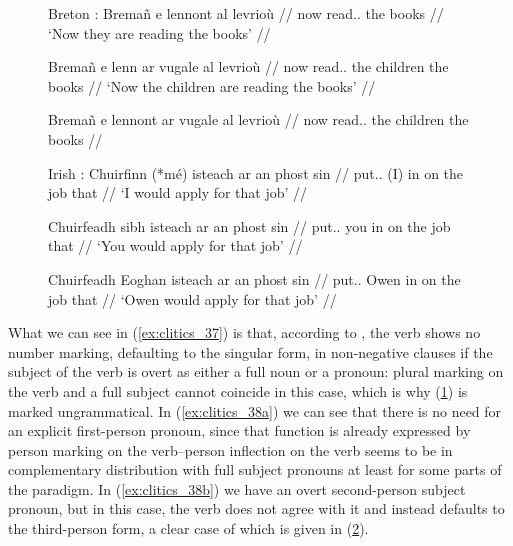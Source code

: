 \begin{figure}
\pex\label{ex:clitics_37}
Breton \parencites[145]{spencerluis2012}[from][]{borsleyetal2007}:
\a\label{ex:clitics_37a}
\begingl
	\gla Bremañ e lennont al levrioù //
	\glb now \Prt{} read.\Prs{}.\Tpl{} the books //
	\glft `Now they are reading the books' //
\endgl

\a\label{ex:clitics_37b}\begingl
	\gla Bremañ e lenn ar vugale al levrioù //
	\glb now \Prt{} read.\Prs{}.\Tsg{} the children the books //
	\glft `Now the children are reading the books' //
\endgl

\a\label{ex:clitics_37c}\ljudge{*}\begingl
	\gla Bremañ e lennont ar vugale al levrioù //
	\glb now \Prt{} read.\Prs{}.\Tpl{} the children the books //
\endgl
\xe
\end{figure}

\begin{figure}
\pex\label{ex:clitics_38}
Irish \parencites[145]{spencerluis2012}[from][]{mccloskeyhale1984}:
\a\label{ex:clitics_38a}
\begingl
	\gla Chuirfinn \textup{(}*mé\textup{)} isteach ar an phost sin //
	\glb put.\Cond{}.\Fsg{} (​I​) in on the job that //
	\glft `I would apply for that job' //
\endgl

\a\label{ex:clitics_38b}\begingl
	\gla Chuirfeadh sibh isteach ar an phost sin //
	\glb put.\Cond{}.\Tsg{} you in on the job that //
	\glft `You would apply for that job' //
\endgl

\a\label{ex:clitics_38c}\begingl
	\gla Chuirfeadh Eoghan isteach ar an phost sin //
	\glb put.\Cond{}.\Tsg{} Owen in on the job that //
	\glft `Owen would apply for that job' //
\endgl
\xe
\end{figure}

What we can see in (\ref{ex:clitics_37}) is that, according to
\citet{spencerluis2012}, the verb shows no number marking, defaulting to the
singular form, in non-negative clauses if the subject of the verb is overt as
either a full noun or a pronoun: plural marking on the verb and a full subject
cannot coincide in this case, which is why (\ref{ex:clitics_37c}) is marked
ungrammatical. In (\ref{ex:clitics_38a}) we can see that there is no need for
an explicit first-person pronoun, since that function is already expressed by
person marking on the verb--person inflection on the verb seems to be in
complementary distribution with full subject pronouns at least for some parts
of the paradigm. In (\ref{ex:clitics_38b}) we have an overt second-person
subject pronoun, but in this case, the verb does not agree with it and instead
defaults to the third-person form, a clear case of which is given in
(\ref{ex:clitics_38c}).

